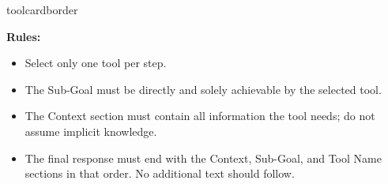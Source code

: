 \begin{custombox}[title=Instruction for {Action Planner}]{toolcardborder}
\vspace{6pt}

\noindent\textbf{Rules:}
\begin{itemize}[left=0pt, label={}, itemsep=0pt, parsep=0pt]
    \item Select {only one} tool per step.
    \item The {Sub-Goal} must be directly and solely achievable by the selected tool.
    \item The {Context} section must contain {all} information the tool needs; do not assume implicit knowledge.
    \item The final response must end with the {Context}, {Sub-Goal}, and {Tool Name} sections in that order. No additional text should follow.
\end{itemize}
\end{custombox}
